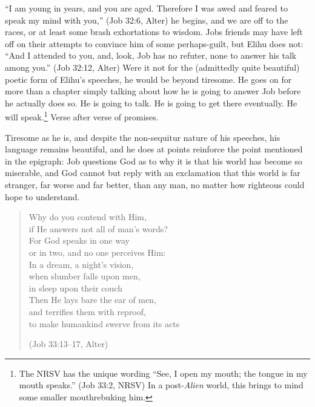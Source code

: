 ``I am young in years, and you are aged. Therefore I was awed and feared to speak my mind with you,'' (Job 32:6, Alter) he begins, and we are off to the races, or at least some brash exhortations to wisdom. Jobs friends may have left off on their attempts to convince him of some perhaps-guilt, but Elihu does not: ``And I attended to you, and, look, Job has no refuter, none to answer his talk among you.'' (Job 32:12, Alter) Were it not for the (admittedly quite beautiful) poetic form of Elihu's speeches, he would be beyond tiresome. He goes on for more than a chapter simply talking about how he is going to answer Job before he actually does so. He is going to talk. He is going to get there eventually. He will speak.\footnote{The NRSV has the unique wording ``See, I open my mouth; the tongue in my mouth speaks.'' (Job 33:2, NRSV) In a post-\emph{Alien} world, this brings to mind some smaller mouth\footnotemark rebuking him.} Verse after verse of promises.

Tiresome as he is, and despite the non-sequitur nature of his speeches, his language remains beautiful, and he does at points reinforce the point mentioned in the epigraph: Job questions God as to why it is that his world has become so miserable, and God cannot but reply with an exclamation that this world is far stranger, far worse and far better, than any man, no matter how righteous could hope to understand.

\begin{verse}
Why do you contend with Him, \\
\vin if He answers not all of man's words? \\
For God speaks in one way \\
\vin or in two, and no one perceives Him: \\
In a dream, a night's vision, \\
\vin when slumber falls upon men, \\
\vin \vin in sleep upon their couch \\
Then He lays bare the ear of men, \\
\vin and terrifies them with reproof, \\
to make humankind swerve from its acts

(Job 33:13--17, Alter)
\end{verse}

